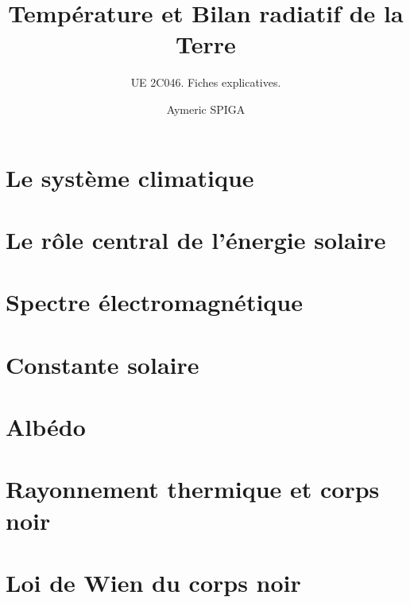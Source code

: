 \documentclass[
	a4paper,
	DIV16,
	10pt]{scrartcl}
\begin{document}
\subject{\texttt{[image: /home/aymeric/Images/Logo/UPMC\_cart-blanc-Q\_7504-703-3.png]}}
\title{Température et Bilan radiatif de la Terre}
\subtitle{UE 2C046. Fiches explicatives.}
\author{Aymeric SPIGA}
\date{}
\publishers{\small Copie et usage interdits sans autorisation explicite de l'auteur.}

\maketitle

\newpage
\section{Le système climatique}


\newpage 
\section{Le rôle central de l'énergie solaire} 


\newpage 
\section{Spectre électromagnétique} 


\newpage 
\section{Constante solaire} 


\newpage 
\section{Albédo} 


\newpage 
\section{Rayonnement thermique et corps noir} 



\newpage
\section{Loi de Wien du corps noir}


\end{document}
